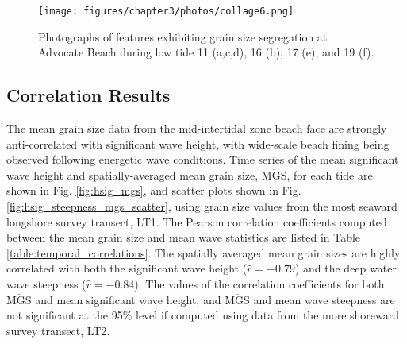 \begin{figure}[tbp] %
	\texttt{[image: figures/chapter3/photos/collage6.png]}
	\caption[Photographs of grain size segregation at Advocate Beach]{Photographs of features exhibiting grain size segregation at Advocate Beach during low tide 11 (a,c,d), 16 (b), 17 (e), and 19 (f).}
	\label{fig:patchiness_photo3}
\end{figure}



\subsection{Correlation Results}


The mean grain size data from the mid-intertidal zone beach face are strongly anti-correlated with significant wave height, with wide-scale beach fining being observed following energetic wave conditions. Time series of the mean significant wave height and spatially-averaged mean grain size, $\overline{\mathrm{MGS}}$, for each tide are shown in Fig. \ref{fig:hsig_mgs}, and scatter plots shown in Fig. \ref{fig:hsig_steepness_mgs_scatter}, using grain size values from the most seaward longshore survey transect, LT1. The Pearson correlation coefficients computed between the mean grain size and mean wave statistics are listed in Table \ref{table:temporal_correlations}. The spatially averaged mean grain sizes are highly correlated with both the significant wave height ($\hat{r}=-0.79$) and the deep water wave steepness ($\hat{r}=-0.84$). The values of the correlation coefficients for both $\overline{\mathrm{MGS}}$ and mean significant wave height, and $\overline{\mathrm{MGS}}$ and mean wave steepness are not significant at the 95\% level if computed using data from the more shoreward survey transect, LT2.

